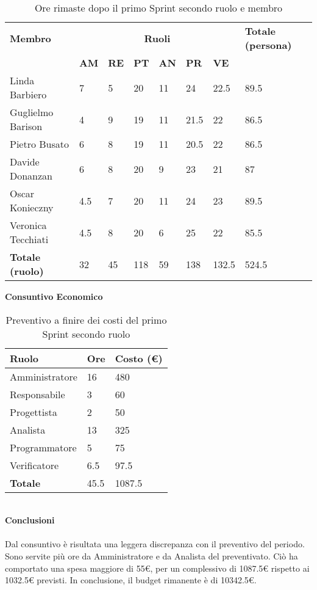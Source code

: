 \begin{table}[ht!]
	\centering
	\begin{tabular}{p{4cm} p{1cm} p{1cm} p{1cm} p{1cm} p{1cm} p{1cm} p{3cm}}
		\toprule
        \textbf{Membro} & \multicolumn{6}{c}{\textbf{Ruoli}} & \textbf{Totale (persona)}\\
		& \textbf{AM} & \textbf{RE} & \textbf{PT} & \textbf{AN} & \textbf{PR} & \textbf{VE}\\
		\midrule
        Linda Barbiero          & 7     & 5     & 20     & 11   & 24     & 22.5   & 89.5 \\
        Guglielmo Barison       & 4     & 9     & 19     & 11   & 21.5   & 22     & 86.5\\
        Pietro Busato           & 6     & 8     & 19     & 11   & 20.5   & 22     & 86.5 \\
        Davide Donanzan         & 6     & 8     & 20     & 9    & 23     & 21     & 87 \\
        Oscar Konieczny         & 4.5   & 7     & 20     & 11   & 24     & 23     & 89.5 \\
        Veronica Tecchiati      & 4.5   & 8     & 20     & 6    & 25     & 22     & 85.5 \\
        \bottomrule
        \textbf{Totale (ruolo)} & 32    & 45    & 118    & 59   & 138     & 132.5 & 524.5 \\
	\end{tabular}
	\caption{Ore rimaste dopo il primo Sprint secondo ruolo e membro}
	\label{table:Ore rimaste dopo il primo Sprint secondo ruolo e membro}
\end{table}
\textbf{Consuntivo Economico}
\begin{table}[ht!]
	\centering
	\begin{tabular}{p{4cm} p{1cm} p{2cm}}
        \toprule
        \textbf{Ruolo} & \textbf{Ore} & \textbf{Costo (€)} \\
        \midrule
        Amministratore & 16 & 480 \\
        Responsabile & 3 & 60 \\
        Progettista & 2 & 50 \\
        Analista & 13 & 325 \\
        Programmatore & 5 & 75 \\
        Verificatore & 6.5 & 97.5 \\
        \bottomrule
        \textbf{Totale} & 45.5 & 1087.5
    \end{tabular}
    \caption{Preventivo a finire dei costi del primo Sprint secondo ruolo}
	\label{table:Preventivo a finire dei costi del primo Sprint secondo ruolo}
\end{table}
\\
\textbf{Conclusioni}
\\\\
Dal consuntivo è risultata una leggera discrepanza con il preventivo del periodo. Sono servite più ore da Amministratore e da Analista del preventivato.
Ciò ha comportato una spesa maggiore di 55€, per un complessivo di 1087.5€ rispetto ai 1032.5€ previsti.
In conclusione, il budget rimanente è di 10342.5€. 

